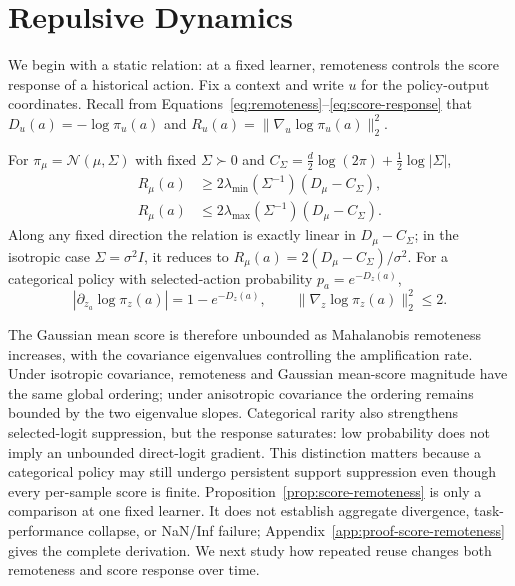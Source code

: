 \section{Repulsive Dynamics}
\label{sec:theory}

We begin with a static relation: at a fixed learner, remoteness controls the score response of a historical action. Fix a context and write $u$ for the policy-output coordinates. Recall from Equations~\eqref{eq:remoteness}--\eqref{eq:score-response} that $D_u(a)=-\log\pi_u(a)$ and $R_u(a)=\|\nabla_u\log\pi_u(a)\|_2^2$.
\begin{proposition}
\label{prop:score-remoteness}
For $\pi_\mu=\mathcal N(\mu,\Sigma)$ with fixed $\Sigma\succ0$ and $C_\Sigma=\tfrac d2\log(2\pi)+\tfrac12\log|\Sigma|$,
\begin{equation}
\begin{aligned}
R_\mu(a)&\ge2\lambda_{\min}(\Sigma^{-1})(D_\mu-C_\Sigma),\\
R_\mu(a)&\le2\lambda_{\max}(\Sigma^{-1})(D_\mu-C_\Sigma).
\end{aligned}
\label{eq:gaussian-score-bounds}
\end{equation}
Along any fixed direction the relation is exactly linear in $D_\mu-C_\Sigma$; in the isotropic case $\Sigma=\sigma^2I$, it reduces to $R_\mu(a)=2(D_\mu-C_\Sigma)/\sigma^2$. For a categorical policy with selected-action probability $p_a=e^{-D_z(a)}$,
\begin{equation}
\left|\partial_{z_a}\log\pi_z(a)\right|=1-e^{-D_z(a)},
\qquad \|\nabla_z\log\pi_z(a)\|_2^2\le2.
\label{eq:categorical-score-bound}
\end{equation}
\end{proposition}
The Gaussian mean score is therefore unbounded as Mahalanobis remoteness increases, with the covariance eigenvalues controlling the amplification rate. Under isotropic covariance, remoteness and Gaussian mean-score magnitude have the same global ordering; under anisotropic covariance the ordering remains bounded by the two eigenvalue slopes. Categorical rarity also strengthens selected-logit suppression, but the response saturates: low probability does not imply an unbounded direct-logit gradient. This distinction matters because a categorical policy may still undergo persistent support suppression even though every per-sample score is finite. Proposition~\ref{prop:score-remoteness} is only a comparison at one fixed learner. It does not establish aggregate divergence, task-performance collapse, or NaN/Inf failure; Appendix~\ref{app:proof-score-remoteness} gives the complete derivation. We next study how repeated reuse changes both remoteness and score response over time.

